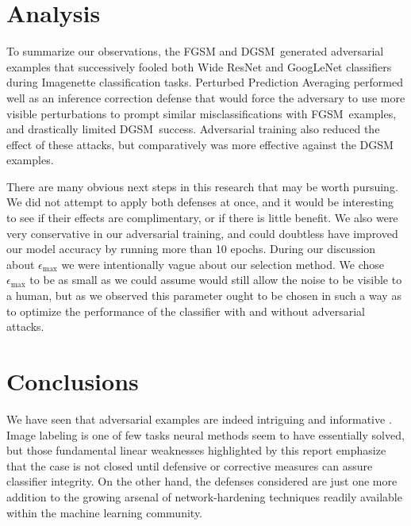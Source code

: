 \documentclass[conference]{IEEEtran}
\begin{document}
\begin{figure*}[h]
\centering%
\texttt{[image: \{Plots/plots\_robust\_net/imagenette\_samples\_fgsm\_plots\_at.jpg]}}
\caption{The classification performance loss achieved by FGSM attacks on
Wide ResNet secured by adversarial training.}
\label{at}
\end{figure*}

\section{Analysis}

To summarize our observations, the FGSM and DGSM\ generated adversarial
examples that successively fooled both Wide ResNet and GoogLeNet classifiers
during Imagenette classification tasks. Perturbed Prediction Averaging
performed well as an inference correction defense that would force the
adversary to use more visible perturbations to prompt similar
misclassifications with FGSM\ examples, and drastically limited DGSM\
success. Adversarial training also reduced the effect of these attacks, but
comparatively was more effective against the DGSM examples. 

There are many obvious next steps in this research that may be worth
pursuing. We did not attempt to apply both defenses at once, and it would be
interesting to see if their effects are complimentary, or if there is little
benefit. We also were very conservative in our adversarial training, and
could doubtless have improved our model accuracy by running more than 10
epochs. During our discussion about $\epsilon _{\max }$ we were
intentionally vague about our selection method. We chose $\epsilon _{\max }$
to be as small as we could assume would still allow the noise to be visible
to a human, but as we observed this parameter ought to be chosen in such a
way as to optimize the performance of the classifier with and without
adversarial attacks.

\section{Conclusions}

We have seen that adversarial examples are indeed intriguing and informative 
\cite{szegedy2014intriguing}. Image labeling is one of few tasks neural
methods seem to have essentially solved, but those fundamental linear
weaknesses highlighted by this report emphasize that the case is not closed
until defensive or corrective measures can assure classifier integrity. On
the other hand, the defenses considered are just one more addition to the
growing arsenal of network-hardening techniques readily available within the
machine learning community.



\end{document}
